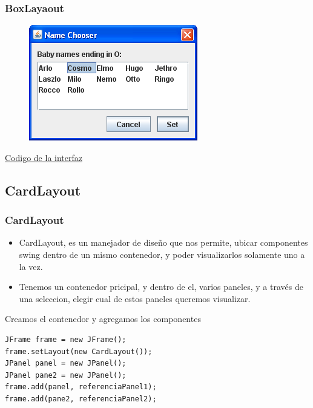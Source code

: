 \documentclass{beamer}
\begin{document}
\begin{frame}[fragile]
    \frametitle{BoxLayaout}
  \begin{figure}
\includegraphics[scale=0.7]{imagenes/bl2.png}
\end{figure}  
\begin{center}{\color{blue}
\href{https://docs.oracle.com/javase/tutorial/displayCode.html?code=https://docs.oracle.com/javase/tutorial/uiswing/examples/components/ListDialogRunnerProject/src/components/ListDialog.java}
{Codigo de la interfaz}}
\end{center}
\end{frame}


\subsection{CardLayout}
\begin{frame}[fragile]
    \frametitle{CardLayout}
\begin{itemize}[<+->]
\item CardLayout,  es un manejador de diseño que nos permite, ubicar componentes swing dentro de un mismo contenedor, y poder visualizarlos solamente uno a la vez.
\item Tenemos un contenedor pricipal, y dentro de el, varios paneles, y a través de una seleccion, elegir cual de estos paneles queremos visualizar.
\end{itemize}
\pause
\begin{block}{Creamos el contenedor y agregamos los componentes}
\begin{verbatim}
JFrame frame = new JFrame();
frame.setLayout(new CardLayout());
JPanel panel = new JPanel();
JPanel pane2 = new JPanel();
frame.add(panel, referenciaPanel1);
frame.add(pane2, referenciaPanel2);
\end{verbatim}
\end{block}
\end{frame}
\end{document}
